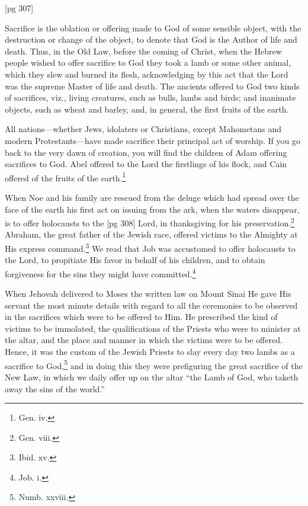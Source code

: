 [pg 307]


Sacrifice is the oblation or offering made
to God of some sensible object, with the destruction
or change of the object, to denote
that God is the Author of life and death. Thus,
in the Old Law, before the coming of Christ, when
the Hebrew people wished to offer sacrifice to God
they took a lamb or some other animal, which they
slew and burned its flesh, acknowledging by this
act that the Lord was the supreme Master of life
and death. The ancients offered to God two kinds
of sacrifices, viz., living creatures, such as bulls,
lambs and birds; and inanimate objects, such as
wheat and barley, and, in general, the first fruits
of the earth.

All nations—whether Jews, idolaters or Christians,
except Mahometans and modern Protestants—have
made sacrifice their principal act of
worship. If you go back to the very dawn of creation,
you will find the children of Adam offering
sacrifices to God. Abel offered to the Lord the
firstlings of his flock, and Cain offered of the fruits
of the earth.\footnote{Gen. iv.}

When Noe and his family are rescued from the
deluge which had spread over the face of the earth
his first act on issuing from the ark, when the
waters disappear, is to offer holocausts to the
[pg 308]
Lord, in thanksgiving for his preservation.\footnote{Gen. viii.} Abraham,
the great father of the Jewish race, offered
victims to the Almighty at His express command.\footnote{Ibid. xv.}
We read that Job was accustomed to offer holocausts
to the Lord, to propitiate His favor in behalf
of his children, and to obtain forgiveness for
the sins they might have committed.\footnote{Job. i.}

When Jehovah delivered to Moses the written
law on Mount Sinai He gave His servant the most
minute details with regard to all the ceremonies to
be observed in the sacrifices which were to be offered
to Him. He prescribed the kind of victims
to be immolated, the qualifications of the Priests
who were to minister at the altar, and the place
and manner in which the victims were to be
offered. Hence, it was the custom of the Jewish
Priests to slay every day two lambs as a sacrifice
to God,\footnote{Numb. xxviii.}
and in doing this they were prefiguring
the great sacrifice of the New Law, in which we
daily offer up on the altar “the Lamb of God, who
taketh away the sins of the world.”

